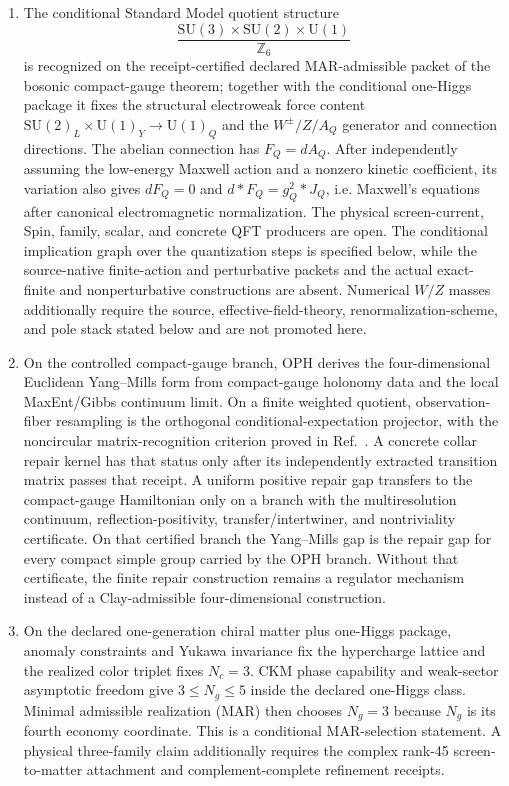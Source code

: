 \documentclass[11pt]{article}
\newcommand{\SU}{\mathrm{SU}}
\newcommand{\U}{\mathrm{U}}
\begin{document}
\begin{enumerate}[leftmargin=2em]
\texttt{evidence/einstein\_convergence} in the project repository. The cap-state modular temperature and the projected margin zero crossing are open measured targets with frozen fail-closed verdicts (\S\ref{subsec:einstein-branch-closure}).
\item The conditional Standard Model quotient structure
\[
\frac{\SU(3)\times\SU(2)\times\U(1)}{\mathbb Z_6}
\]
is recognized on the receipt-certified declared MAR-admissible packet of the bosonic compact-gauge theorem; together with the conditional one-Higgs package it fixes the structural electroweak force content \(\SU(2)_L\times\U(1)_Y\to\U(1)_Q\) and the \(W^\pm/Z/A_Q\) generator and connection directions. The abelian connection has \(F_Q=dA_Q\). After independently assuming the low-energy Maxwell action and a nonzero kinetic coefficient, its variation also gives \(dF_Q=0\) and \(d*F_Q=g_Q^2*J_Q\), i.e. Maxwell's equations after canonical electromagnetic normalization. The physical screen-current, Spin, family, scalar, and concrete QFT producers are open. The conditional implication graph over the quantization steps is specified below, while the source-native finite-action and perturbative packets and the actual exact-finite and nonperturbative constructions are absent. Numerical \(W/Z\) masses additionally require the source, effective-field-theory, renormalization-scheme, and pole stack stated below and are not promoted here.
\item On the controlled compact-gauge branch, OPH derives the four-dimensional
Euclidean Yang--Mills form from compact-gauge holonomy data and the local MaxEnt/Gibbs
continuum limit. On a finite weighted quotient, observation-fiber resampling is the orthogonal
conditional-expectation projector, with the noncircular matrix-recognition criterion proved in
Ref.~\cite{observableNormalForms}. A concrete collar repair kernel has that status only after its
independently extracted transition matrix passes that receipt. A uniform positive repair gap
transfers to the compact-gauge Hamiltonian only on a
branch with the multiresolution continuum, reflection-positivity, transfer/intertwiner, and
nontriviality certificate. On that certified branch the Yang--Mills gap is the repair gap for
every compact simple group carried by the OPH branch. Without that certificate, the finite repair
construction remains a regulator mechanism instead of a Clay-admissible four-dimensional
construction.
\item On the declared one-generation chiral matter plus one-Higgs package, anomaly constraints and Yukawa invariance fix the hypercharge lattice and the realized color triplet fixes \(N_c=3\). CKM phase capability and weak-sector asymptotic freedom give \(3\le N_g\le5\) inside the declared one-Higgs class. Minimal admissible realization (MAR) then chooses \(N_g=3\) because \(N_g\) is its fourth economy coordinate. This is a conditional MAR-selection statement. A physical three-family claim additionally requires the complex rank-45 screen-to-matter attachment and complement-complete refinement receipts.

\end{enumerate}
\end{document}
